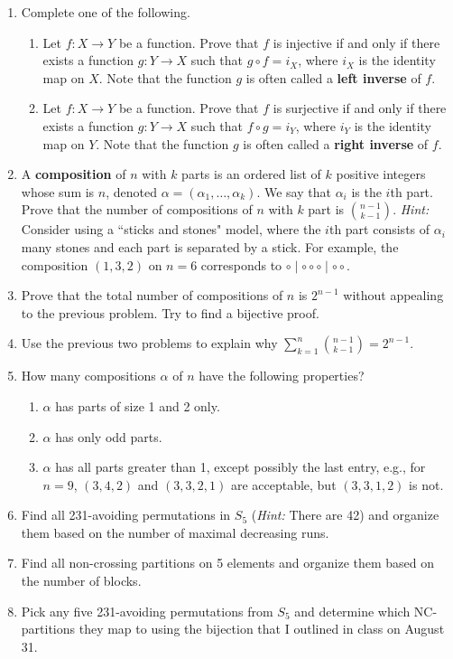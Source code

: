 \documentclass[11pt]{article}%
\theoremstyle{definition}
\begin{document}
\begin{enumerate}

\item Complete one of the following.
\begin{enumerate}
\item Let $f:X\to Y$ be a function.  Prove that $f$ is injective if and only if there exists a function $g:Y\to X$ such that $g\circ f=i_X$, where $i_X$ is the identity map on $X$. Note that the function $g$ is often called a \textbf{left inverse} of $f$.
\item Let $f:X\to Y$ be a function.  Prove that $f$ is surjective if and only if there exists a function $g:Y\to X$ such that $f\circ g=i_Y$, where $i_Y$ is the identity map on $Y$. Note that the function $g$ is often called a \textbf{right inverse} of $f$.
\end{enumerate}
\item A \textbf{composition} of $n$ with $k$ parts is an ordered list of $k$ positive integers whose sum is $n$, denoted $\alpha=(\alpha_1,\ldots,\alpha_k)$.  We say that $\alpha_i$ is the $i$th part.  Prove that the number of compositions of $n$ with $k$ part is $\binom{n-1}{k-1}$.  \emph{Hint:} Consider using a ``sticks and stones" model, where the $i$th part consists of $\alpha_i$ many stones and each part is separated by a stick. For example, the composition $(1,3,2)$ on $n=6$ corresponds to $\circ \mid \circ \circ \circ \mid \circ \circ$.
\item Prove that the total number of compositions of $n$ is $2^{n-1}$ without appealing to the previous problem. Try to find a bijective proof.
\item Use the previous two problems to explain why $\sum_{k=1}^n\binom{n-1}{k-1}=2^{n-1}$.
\item\label{nugget} How many compositions $\alpha$ of $n$ have the following properties?
\begin{enumerate}
\item $\alpha$ has parts of size 1 and 2 only.
\item $\alpha$ has only odd parts.
\item $\alpha$ has all parts greater than 1, except possibly the last entry, e.g., for $n=9$, $(3,4,2)$ and $(3,3,2,1)$ are acceptable, but $(3,3,1,2)$ is not.
\end{enumerate}
\item Find all 231-avoiding permutations in $S_5$ (\emph{Hint:} There are 42) and organize them based on the number of maximal decreasing runs.
\item Find all non-crossing partitions on 5 elements and organize them based on the number of blocks.
\item Pick any five 231-avoiding permutations from $S_5$ and determine which NC-partitions they map to using the bijection that I outlined in class on August 31.
\end{enumerate}
\end{document}
